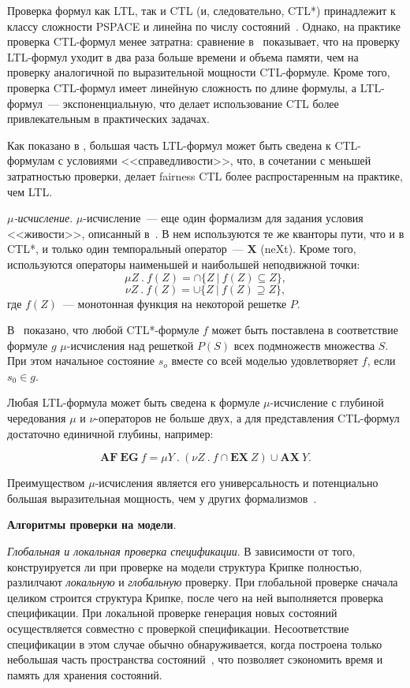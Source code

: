 \documentclass[a4paper,notitlepage,14pt]{article}
\begin{document}
Проверка формул как LTL, так и CTL (и, следовательно, CTL*) принадлежит к классу сложности
PSPACE и линейна по числу состояний~\cite{Sistla85complexity}. Однако, на практике
проверка CTL-формул менее затратна: сравнение в~\cite{DBLP:conf/spin/FaragoS09}
показывает, что на проверку LTL-формул уходит в два раза больше времени и объема памяти,
чем на проверку аналогичной по выразительной мощности CTL-формуле. Кроме того, проверка
CTL-формул имеет линейную сложность по длине формулы, а LTL-формул~--- экспоненциальную,
что делает использование CTL более привлекательным в практических задачах.

Как показано в \cite{Clarke97anotherlook}, большая часть LTL-формул может быть сведена к
CTL-формулам с условиями <<справедливости>>, что, в сочетании с меньшей затратностью
проверки, делает fairness CTL более распростаренным на практике, чем LTL.


\textit{$\mu$-исчисление}. $\mu$-исчисление~--- еще один формализм для задания условия
<<живости>>, описанный в~\cite{Clarke}. В нем используются те же кванторы пути, что и в
CTL*, и только один темпоральный оператор~--- $\mathbf{X}$ (neXt). Кроме того,
используются операторы наименьшей и наибольшей неподвижной точки:
$$ \mu Z~.~f(Z) = \cap \{Z~|~f(Z) \subseteq Z\}, $$
$$ \nu Z~.~f(Z) = \cup \{Z~|~f(Z) \supseteq Z\}, $$
где $f(Z)$~--- монотонная функция на некоторой решетке $P$.

В~\cite{Emerson97modelchecking} показано, что любой CTL*-формуле $f$ может быть поставлена
в соответствие формуле $g$ $\mu$-исчисления над решеткой $P(S)$ всех подмножеств множества
$S$. При этом начальное состояние $s_o$ вместе со всей моделью удовлетворяет $f$, если
$s_0 \in g$.

Любая LTL-формула может быть сведена к формуле $\mu$-исчисление с глубиной чередования
$\mu$ и $\nu$-операторов не больше двух, а для представления CTL-формул достаточно
единичной глубины, например:

$$\mathbf{AF~EG}~f = \mu Y~.~(\nu Z~.~f \cap \mathbf{EX}~Z) \cup \mathbf{AX}~Y.$$

Преимуществом $\mu$-исчисления является его универсальность и потенциально большая
выразительная мощность, чем у других формализмов~\cite{Emerson97modelchecking}.

\textbf{Алгоритмы проверки на модели}.

\textit{Глобальная и локальная проверка спецификации}. В зависимости от того,
конструируется ли при проверке на модели структура Крипке полностью, разлилчают
\emph{локальную} и \emph{глобальную} проверку. При глобальной проверке сначала целиком
строится структура Крипке, после чего на ней выполняется проверка спецификации. При
локальной проверке генерация новых состояний осуществляется совместно с проверкой
спецификации. Несоответствие спецификации в этом случае обычно обнаруживается, когда
построена только небольшая часть пространства состояний~\cite{Clarke}, что позволяет
сэкономить время и память для хранения состояний.
\end{document}

